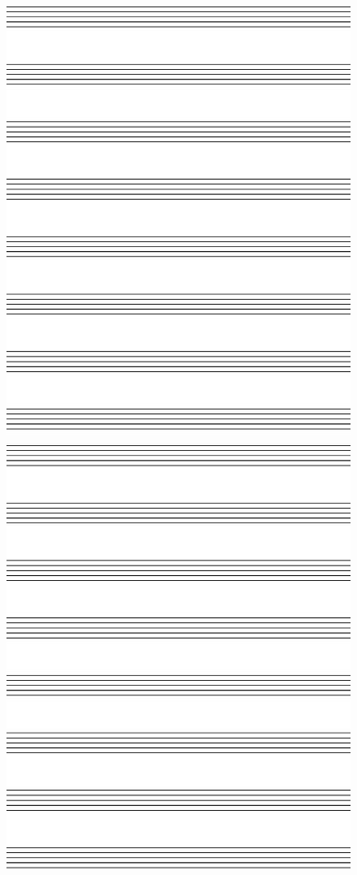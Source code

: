 \begin{figure}
\centering
\includegraphics[width=7.5in]{graphics/staves.eps}
\end{figure}

\begin{figure}
\centering
\includegraphics[width=7.5in]{graphics/staves.eps}
\end{figure}

